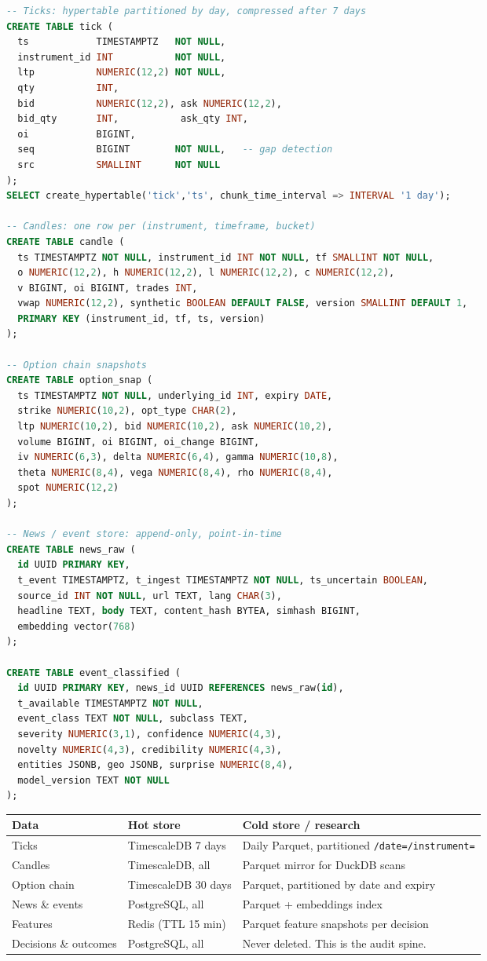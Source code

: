 \begin{lstlisting}[language=SQL,caption={Core TimescaleDB schema (abridged)}]
-- Ticks: hypertable partitioned by day, compressed after 7 days
CREATE TABLE tick (
  ts            TIMESTAMPTZ   NOT NULL,
  instrument_id INT           NOT NULL,
  ltp           NUMERIC(12,2) NOT NULL,
  qty           INT,
  bid           NUMERIC(12,2), ask NUMERIC(12,2),
  bid_qty       INT,           ask_qty INT,
  oi            BIGINT,
  seq           BIGINT        NOT NULL,   -- gap detection
  src           SMALLINT      NOT NULL
);
SELECT create_hypertable('tick','ts', chunk_time_interval => INTERVAL '1 day');

-- Candles: one row per (instrument, timeframe, bucket)
CREATE TABLE candle (
  ts TIMESTAMPTZ NOT NULL, instrument_id INT NOT NULL, tf SMALLINT NOT NULL,
  o NUMERIC(12,2), h NUMERIC(12,2), l NUMERIC(12,2), c NUMERIC(12,2),
  v BIGINT, oi BIGINT, trades INT,
  vwap NUMERIC(12,2), synthetic BOOLEAN DEFAULT FALSE, version SMALLINT DEFAULT 1,
  PRIMARY KEY (instrument_id, tf, ts, version)
);

-- Option chain snapshots
CREATE TABLE option_snap (
  ts TIMESTAMPTZ NOT NULL, underlying_id INT, expiry DATE,
  strike NUMERIC(10,2), opt_type CHAR(2),
  ltp NUMERIC(10,2), bid NUMERIC(10,2), ask NUMERIC(10,2),
  volume BIGINT, oi BIGINT, oi_change BIGINT,
  iv NUMERIC(6,3), delta NUMERIC(6,4), gamma NUMERIC(10,8),
  theta NUMERIC(8,4), vega NUMERIC(8,4), rho NUMERIC(8,4),
  spot NUMERIC(12,2)
);

-- News / event store: append-only, point-in-time
CREATE TABLE news_raw (
  id UUID PRIMARY KEY,
  t_event TIMESTAMPTZ, t_ingest TIMESTAMPTZ NOT NULL, ts_uncertain BOOLEAN,
  source_id INT NOT NULL, url TEXT, lang CHAR(3),
  headline TEXT, body TEXT, content_hash BYTEA, simhash BIGINT,
  embedding vector(768)
);

CREATE TABLE event_classified (
  id UUID PRIMARY KEY, news_id UUID REFERENCES news_raw(id),
  t_available TIMESTAMPTZ NOT NULL,
  event_class TEXT NOT NULL, subclass TEXT,
  severity NUMERIC(3,1), confidence NUMERIC(4,3),
  novelty NUMERIC(4,3), credibility NUMERIC(4,3),
  entities JSONB, geo JSONB, surprise NUMERIC(8,4),
  model_version TEXT NOT NULL
);
\end{lstlisting}

\begin{longtable}{@{}p{3.4cm}p{3.0cm}p{7.8cm}@{}}
\toprule
\textbf{Data} & \textbf{Hot store} & \textbf{Cold store / research}\\
\midrule
Ticks & TimescaleDB 7 days & Daily Parquet, partitioned
\texttt{/date=/instrument=}\\
Candles & TimescaleDB, all & Parquet mirror for DuckDB scans\\
Option chain & TimescaleDB 30 days & Parquet, partitioned by date and expiry\\
News \& events & PostgreSQL, all & Parquet + embeddings index\\
Features & Redis (TTL 15 min) & Parquet feature snapshots per decision\\
Decisions \& outcomes & PostgreSQL, all & Never deleted. This is the audit
spine.\\
\bottomrule
\end{longtable}

